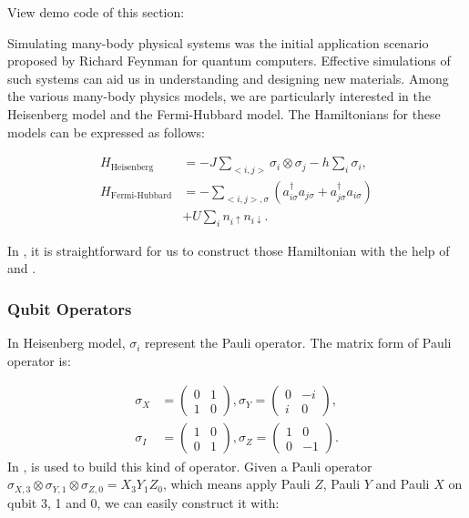 View demo code of this section: 

Simulating many-body physical systems was the initial application scenario proposed by Richard Feynman for quantum computers. Effective simulations of such systems can aid us in understanding and designing new materials. Among the various many-body physics models, we are particularly interested in the Heisenberg model and the Fermi-Hubbard model. The Hamiltonians for these models can be expressed as follows:

\begin{align*}
    H_\text{Heisenberg}    & = -J\sum_{<i,j>}\sigma_i\otimes \sigma_j-h\sum_i\sigma_i,                                            \\
    H_\text{Fermi-Hubbard} & = -\sum_{<i,j>,\sigma}\left(a_{i\sigma}^\dagger a_{j\sigma} + a_{j\sigma}^\dagger a_{i\sigma}\right) \\
                           & + U\sum_i n_{i\uparrow}n_{i\downarrow}.
\end{align*}

In \MindQuantum, it is straightforward for us to construct those Hamiltonian with the help of \QubitOperator and \FermionOperator.

\subsubsection{Qubit Operators}

In Heisenberg model, $\sigma_i$ represent the Pauli operator. The matrix form of Pauli operator is:

\begin{align*}
    \sigma_X & = \begin{pmatrix}
        0 & 1 \\
        1 & 0
    \end{pmatrix}, \sigma_Y = \begin{pmatrix}
        0 & -i \\
        i & 0
    \end{pmatrix}, \\
    \sigma_I & =\begin{pmatrix}
        1 & 0 \\
        0 & 1
    \end{pmatrix}, \sigma_Z = \begin{pmatrix}
        1 & 0  \\
        0 & -1
    \end{pmatrix}.
\end{align*}
In \MindQuantum, \QubitOperator is used to build this kind of operator. Given a Pauli operator $\sigma_{X,3}\otimes \sigma_{Y,1}\otimes \sigma_{Z,0}=X_3 Y_1 Z_0$, which means apply Pauli $Z$, Pauli $Y$ and Pauli $X$ on qubit 3, 1 and 0,  we can easily construct it with:

